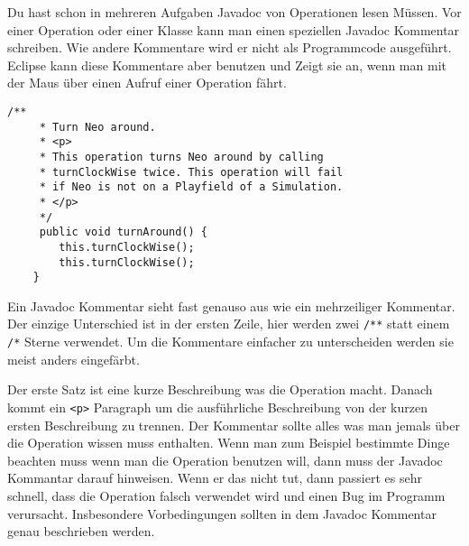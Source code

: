 \begin{Infobox}[Javadoc]
    Du hast schon in mehreren Aufgaben Javadoc von Operationen lesen Müssen.
    Vor einer Operation oder einer Klasse kann man einen speziellen Javadoc Kommentar schreiben.
    Wie andere Kommentare wird er nicht als Programmcode ausgeführt.
    Eclipse kann diese Kommentare aber benutzen und Zeigt sie an, wenn man mit der Maus über einen Aufruf einer Operation fährt.

    \begin{lstlisting}[numbers=none]
    /**
     * Turn Neo around.
     * <p>
     * This operation turns Neo around by calling 
     * turnClockWise twice. This operation will fail 
     * if Neo is not on a Playfield of a Simulation.
     * </p>
     */
     public void turnAround() {
        this.turnClockWise();
        this.turnClockWise();
    }
    \end{lstlisting}

    Ein Javadoc Kommentar sieht fast genauso aus wie ein mehrzeiliger Kommentar.
    Der einzige Unterschied ist in der ersten Zeile, hier werden zwei \lstinline{/**} statt einem \lstinline{/*} Sterne verwendet.
    Um die Kommentare einfacher zu unterscheiden werden sie meist anders eingefärbt.
    
    Der erste Satz ist eine kurze Beschreibung was die Operation macht.
    Danach kommt ein \texttt{<p>} Paragraph um die ausführliche Beschreibung von der kurzen ersten Beschreibung zu trennen.
    Der Kommentar sollte alles was man jemals über die Operation wissen muss enthalten.
    Wenn man zum Beispiel bestimmte Dinge beachten muss wenn man die Operation benutzen will, dann muss der Javadoc Kommantar darauf hinweisen.
    Wenn er das nicht tut, dann passiert es sehr schnell, dass die Operation falsch verwendet wird und einen Bug im Programm verursacht.
    Insbesondere Vorbedingungen sollten in dem Javadoc Kommentar genau beschrieben werden.

\end{Infobox}


